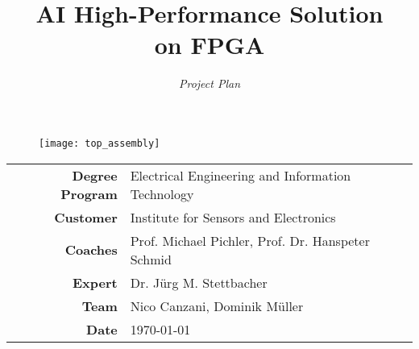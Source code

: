 \documentclass[final]{fhnwthesis}
\title{\textbf{{\Huge AI High-Performance Solution \\[2mm] on FPGA}}}
\author{\textit{{\LARGE Project Plan}}}
\date{}
\begin{document}
\maketitle

\begin{figure}[H]
  \centering
  \texttt{[image: top\_assembly]}
\end{figure}

\vfill
\begin{center}
  \begin{tabular}{>{\bfseries\large}rl}
    Degree Program & Electrical Engineering and Information Technology \\[2mm]
    Customer       & Institute for Sensors and Electronics \\[2mm]
    Coaches        & Prof. Michael Pichler, Prof. Dr. Hanspeter Schmid \\[2mm]
    Expert         & Dr. J\"urg M. Stettbacher \\[2mm]
    Team           & Nico Canzani, Dominik M\"uller \\[2mm]
    Date           & \today
  \end{tabular}
\end{center}
\clearpage

\tableofcontents
\clearpage











\end{document}
